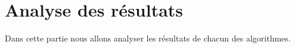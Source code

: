 \chapter{Analyse des résultats}
\par Dans cette partie nous allons analyser les résultats de chacun des algorithmes.
\section{}
